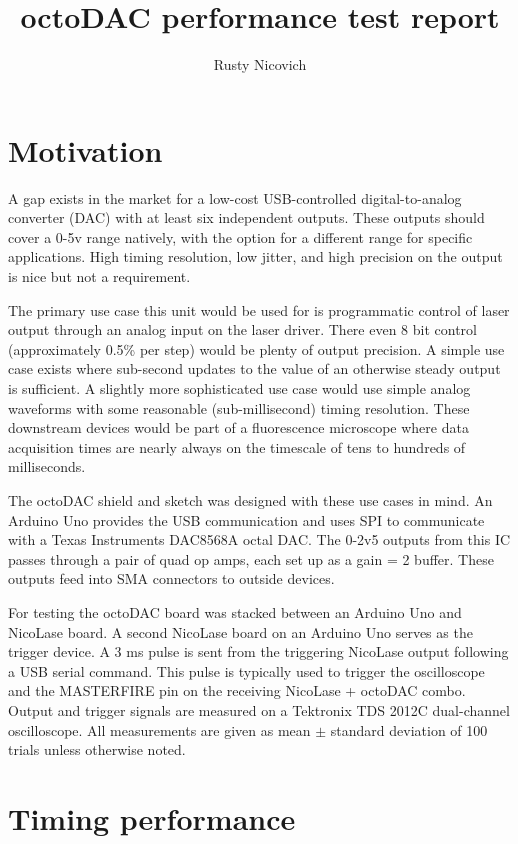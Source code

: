 \documentclass[10pt,a4paper]{article}
\author{Rusty Nicovich}
\title{octoDAC performance test report}
\begin{document}
\maketitle


\section{Motivation}

A gap exists in the market for a low-cost USB-controlled digital-to-analog converter (DAC) with at least six independent outputs.  These outputs should cover a 0-5v range natively, with the option for a different range for specific applications.  High timing resolution, low jitter, and high precision on the output is nice but not a requirement.  

The primary use case this unit would be used for is programmatic control of laser output through an analog input on the laser driver.  There even 8 bit control (approximately 0.5\% per step) would be plenty of output precision.  A simple use case exists where sub-second updates to the value of an otherwise steady output is sufficient.  A slightly more sophisticated use case would use simple analog waveforms with some reasonable (sub-millisecond) timing resolution.  These downstream devices would be part of a fluorescence microscope where data acquisition times are nearly always on the timescale of tens to hundreds of milliseconds.  
 
The octoDAC shield and sketch was designed with these use cases in mind.  An Arduino Uno provides the USB communication and uses SPI to communicate with a Texas Instruments DAC8568A octal DAC.  The 0-2v5 outputs from this IC passes through a pair of quad op amps, each set up as a gain = 2 buffer. These outputs feed into SMA connectors to outside devices.  

For testing the octoDAC board was stacked between an Arduino Uno and NicoLase board.  A second NicoLase board on an Arduino Uno serves as the trigger device. A 3 ms pulse is sent from the triggering NicoLase output following a USB serial command.  This pulse is typically used to trigger the oscilloscope and the MASTERFIRE pin on the receiving NicoLase + octoDAC combo.  Output and trigger signals are measured on a Tektronix TDS 2012C dual-channel oscilloscope.  All measurements are given as mean $\pm$ standard deviation of 100 trials unless otherwise noted.

\section{Timing performance}
\end{document}
